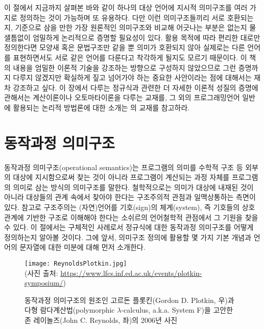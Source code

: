 이 절에서 지금까지 살펴본 바와 같이 하나의 대상 언어에 지시적 의미구조를
여러 가지로 정의하는 것이 가능하며 또 유용하다. 다만 이런 의미구조들끼리
서로 호환되는지, 기준으로 삼을 만한 가장 원론적인 의미구조와 비교해
어긋나는 부분은 없는지 물샐틈없이 엄밀하게 논리적으로 증명할 필요성이 있다.
활용 목적에 따라 편리한 대로만 정의한다면 모양새 혹은
문법구조만 같을 뿐 의미가 호환되지 않아 실제로는 다른 언어를 표현하면서도
서로 같은 언어를 다룬다고 착각하게 될지도 모르기 때문이다. 이 책의 내용을
엄밀한 이론적 기술을 강조하는 방향으로 구성하지 않았으므로 그런 증명까지
다루지 않겠지만 확실하게 짚고 넘어가야 하는 중요한 사안이라는 점에 대해서는
재차 강조하고 싶다. 이 장에서 다루는 정규식과 관련한 더 자세한 이론적
성질의 증명에 관해서는 계산이론이나 오토마타이론을 다루는
교재\cite{Sipser2013,Hopcroft2007}를, 그 외의 프로그래밍언어 일반에
활용되는 논리적 방법론에 대한 소개는 \citet{PFPL2nd}의 교재를 참고하라.


\section{동작과정 의미구조}
동작과정 의미구조(operational semantics)\cite{Plotkin1981sos}는
프로그램의 의미를 수학적 구조 등 외부의 대상에 지시함으로써 찾는 것이
아니라 프로그램이 계산되는 과정 자체를 프로그램의 의미로 삼는 방식의
의미구조를 말한다. 철학적으로는 의미가 대상에 내재된 것이 아니라 대상들의
관계 속에서 찾아야 한다는 구조주의적 관점과 일맥상통하는 측면이 있다.
참고로 구조주의는 (자연)언어를 기호(sign)의 체계(system), 즉 기호들의
상호관계에 기반한 구조로 이해해야 한다는 소쉬르\cite{Saussure1916}의
언어철학적 관점에서 그 기원을 찾을 수 있다. 이 절에서는 구체적인
사례로서 정규식에 대한 동작과정 의미구조를 어떻게 정의하는지 알아볼
것이다. 그에 앞서, 의미구조 정의에 활용할 몇 가지 기본 개념과
언어의 문자열에 대한 미분에 대해 먼저 소개한다.

\begin{figure}\centering
\texttt{[image: ReynoldsPlotkin.jpg]}\\
{\footnotesize(사진 출처:
\url{https://www.lfcs.inf.ed.ac.uk/events/plotkin-symposium/})}
\caption{동작과정 의미구조의 원조인 고르돈 플롯킨(Gordon D. Plotkin, 우)과
다형 람다계산법(polymorphic $\lambda$-calculus, a.k.a. System F)을
고안한 존 레이놀즈(John C. Reynolds, 좌)의 2006년 사진}
\end{figure}


